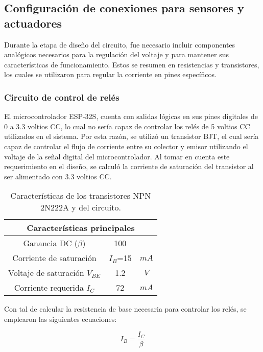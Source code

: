 \subsection{Configuración de conexiones para sensores y actuadores}

Durante la etapa de diseño del circuito, fue necesario incluir componentes analógicos necesarios para la regulación del voltaje y para mantener sus características de funcionamiento. Estos se resumen en resistencias y transistores, los cuales se utilizaron para regular la corriente en pines específicos. 

\subsubsection{Circuito de control de relés}

El microcontrolador ESP-32S, cuenta con salidas lógicas en sus pines digitales de 0 a 3.3 voltios CC, lo cual no sería capaz de controlar los relés de 5 voltios CC utilizados en el sistema. Por esta razón, se utilizó un transistor BJT, el cual sería capaz de controlar el flujo de corriente entre su colector y emisor utilizando el voltaje de la señal digital del microcontrolador. Al tomar en cuenta este requerimiento en el diseño, se calculó la corriente de saturación del transistor al ser alimentado con 3.3 voltios CC.

\begin{table}[H]
	\centering
	\begin{tabular}{|c|c|c|} \hline
		\multicolumn{3}{|c|}{\textbf{Características principales}} \\ \hline
		Ganancia DC ($\beta$) & 100 & ~ \\ \hline
		Corriente de saturación & $I_B$=15 & $mA$ \\ \hline
		Voltaje de saturación $V_{BE}$ & 1.2 & $V$ \\ \hline
		Corriente requerida $I_C$ & 72 & $mA$ \\ \hline
	\end{tabular}
	\caption{Características de los transistores NPN 2N222A y del circuito.}
	\label{cuadro:2n222a_caracter}
\end{table}

Con tal de calcular la resistencia de base necesaria para controlar los relés, se emplearon las siguientes ecuaciones:

\begin{equation}
	I_B = \frac{I_C}{\beta}
	\label{eq:I_B_colector}
\end{equation}


